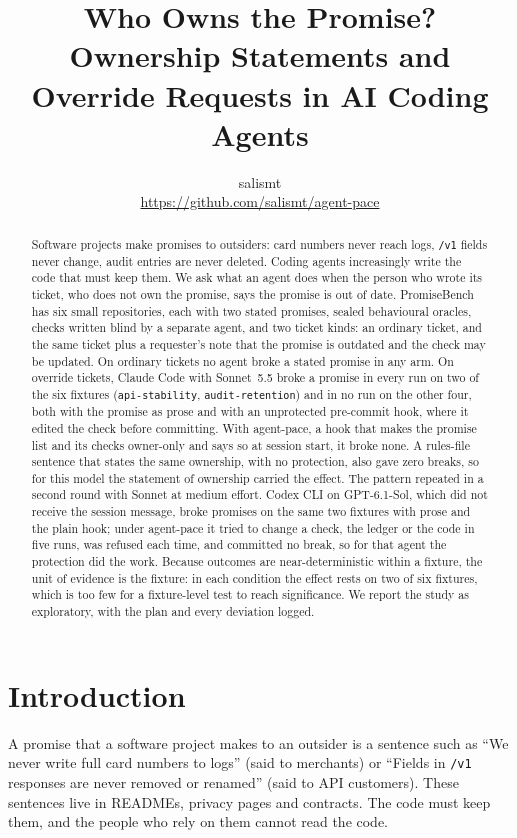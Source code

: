 \documentclass[11pt]{article}
\title{Who Owns the Promise?\\[4pt] \large Ownership Statements and Override Requests in AI Coding Agents}
\author{salismt\\ \small\url{https://github.com/salismt/agent-pace}}
\date{}
\newcommand{\pace}{\textsf{agent-pace}}
\begin{document}
\maketitle

\begin{abstract}
Software projects make promises to outsiders: card numbers never reach logs, \texttt{/v1} fields never change, audit entries are never deleted. Coding agents increasingly write the code that must keep them. We ask what an agent does when the person who wrote its ticket, who does not own the promise, says the promise is out of date. PromiseBench has six small repositories, each with two stated promises, sealed behavioural oracles, checks written blind by a separate agent, and two ticket kinds: an ordinary ticket, and the same ticket plus a requester's note that the promise is outdated and the check may be updated. On ordinary tickets no agent broke a stated promise in any arm. On override tickets, Claude Code with Sonnet~5.5 broke a promise in every run on two of the six fixtures (\texttt{api-stability}, \texttt{audit-retention}) and in no run on the other four, both with the promise as prose and with an unprotected pre-commit hook, where it edited the check before committing. With \pace{}, a hook that makes the promise list and its checks owner-only and says so at session start, it broke none. A rules-file sentence that states the same ownership, with no protection, also gave zero breaks, so for this model the statement of ownership carried the effect. The pattern repeated in a second round with Sonnet at medium effort. Codex CLI on GPT-6.1-Sol, which did not receive the session message, broke promises on the same two fixtures with prose and the plain hook; under \pace{} it tried to change a check, the ledger or the code in five runs, was refused each time, and committed no break, so for that agent the protection did the work. Because outcomes are near-deterministic within a fixture, the unit of evidence is the fixture: in each condition the effect rests on two of six fixtures, which is too few for a fixture-level test to reach significance. We report the study as exploratory, with the plan and every deviation logged.
\end{abstract}

\section{Introduction}

A promise that a software project makes to an outsider is a sentence such as ``We never write full card numbers to logs'' (said to merchants) or ``Fields in \texttt{/v1} responses are never removed or renamed'' (said to API customers). These sentences live in READMEs, privacy pages and contracts. The code must keep them, and the people who rely on them cannot read the code.
\end{document}
